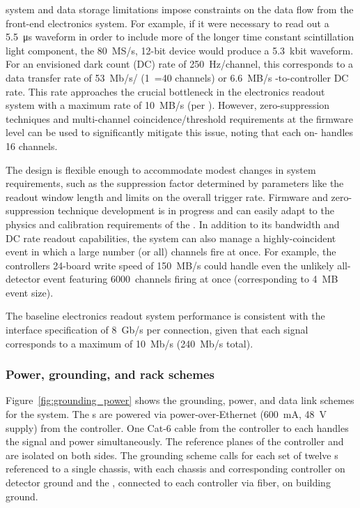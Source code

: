  system and data storage limitations impose constraints on the  data flow from the front-end electronics system. 
For example, if it were necessary to read out a \SI{5.5}{\micro\second} waveform in order to include more of the longer time constant scintillation light component, the \SI{80}{MS/s}, 12-bit  device would produce a 5.3~kbit waveform. For an envisioned dark count (DC) rate of 250~Hz/channel, this corresponds to a data transfer rate of \SI{53}{Mb/s}/ (1~=40 channels) or \SI{6.6}{MB/s} -to-controller DC rate. This rate approaches the crucial bottleneck in the electronics readout system with a maximum rate of \SI{10}{MB/s} (per ). However, zero-suppression techniques and multi-channel coincidence/threshold requirements at the  firmware level can be used to significantly mitigate this issue, noting that each on-  handles 16 channels. 

The design is flexible enough to accommodate modest changes in system requirements, such as the suppression factor determined by parameters like the readout window length and limits on the overall trigger rate. 
Firmware and zero-suppression technique development is in progress and can easily adapt to the physics and calibration requirements of the .
In addition to its bandwidth and DC rate readout capabilities, the system can also  manage a highly-coincident event in which a large number (or all) channels fire at once. %
For example, the controllers 24-board write speed of \SI{150}{MB/s} could handle even the unlikely all-detector event featuring 6000~channels firing at once (corresponding to \SI{4}{MB} event size). 

The baseline electronics readout system performance is consistent with the  interface specification of \SI{8}{Gb/s} per connection, given that
each  signal corresponds to a maximum of \SI{10}{Mb/s} (\SI{240}{Mb/s} total).  

\subsubsection{Power, grounding, and rack schemes} 

Figure~\ref{fig:grounding_power} shows the grounding, power, and data link schemes for the system. The s are powered via power-over-Ethernet (\SI{600}{mA}, \SI{48}{V} supply) from the controller. One Cat-6 cable from the controller to each  handles the signal and power simultaneously. The reference planes of the controller and  are isolated on both sides. The grounding scheme calls for each set of twelve s referenced to a single chassis, with each chassis and corresponding controller on detector ground and the , connected to each controller via fiber, on building ground. 
 
